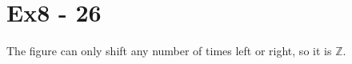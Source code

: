 \section*{Ex8 - 26}
The figure can only shift any number of times left or right, so it is $ \mathbb{Z} $.